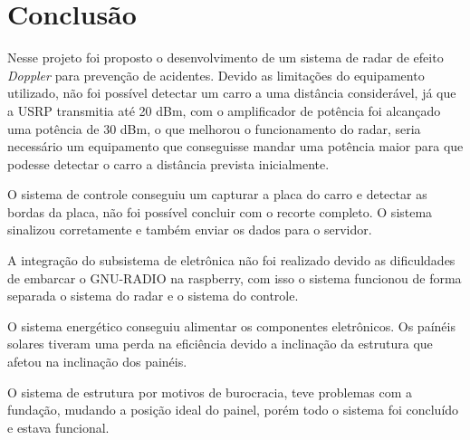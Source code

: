     \section{Conclusão}
    
    Nesse projeto foi proposto o desenvolvimento de um sistema de radar de efeito \emph{Doppler} para prevenção de acidentes. Devido as limitações do equipamento utilizado, não foi possível detectar um carro a uma distância considerável, já que a USRP transmitia até 20 dBm, com o amplificador de potência foi alcançado uma potência de 30 dBm, o que melhorou o funcionamento do radar, seria necessário um equipamento que conseguisse mandar uma potência maior para que podesse detectar o carro a distância prevista inicialmente.
    
    O sistema de controle conseguiu um capturar a placa do carro e detectar as bordas da placa, não foi possível concluir com o recorte completo. O sistema sinalizou corretamente e também enviar os dados para o servidor. 
    
    A integração do subsistema de eletrônica não foi realizado devido as dificuldades de embarcar o GNU-RADIO na raspberry, com isso o sistema funcionou de forma separada o sistema do radar e o sistema do controle.
    
    O sistema energético conseguiu alimentar os componentes eletrônicos. Os paínéis solares tiveram uma perda na eficiência devido a inclinação da estrutura que afetou na inclinação dos painéis.
    
    O sistema de estrutura por motivos de burocracia, teve problemas com a fundação, mudando a posição ideal do painel, porém todo o sistema foi concluído e estava funcional.

    
